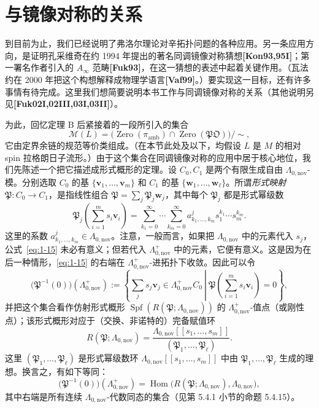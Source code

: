 
\section{与镜像对称的关系}
\label{sec:1-4}

到目前为止，我们已经说明了弗洛尔理论对辛拓扑问题的各种应用。另一条应用方向，是证明孔采维奇在约 1994 年提出的著名同调镜像对称猜想\textbf{[Kon93,95I]}；第一署名作者引入的 $A_\infty$ 范畴\textbf{[Fuk93]}，在这一猜想的表述中起着关键作用。（瓦法约在 2000 年把这个构想解释成物理学语言\textbf{[Vaf99]}。）要实现这一目标，还有许多事情有待完成。这里我们想简要说明本书工作与同调镜像对称的关系（其他说明另见\textbf{[Fuk02I,02III,03I,03II]}）。

为此，回忆定理 B 后紧接着的一段所引入的集合
\[
  \mathcal M(L)
  =\bigl(\operatorname{Zero}(\pi_{\mathrm{amb}})
    \cap\operatorname{Zero}(\mathfrak{PO})\bigr)/{\sim},
\]
它由定界余链的规范等价类组成。（在本节此处及以下，均假设 $L$ 是 $M$ 的相对 spin 拉格朗日子流形。）由于这个集合在同调镜像对称的应用中居于核心地位，我们先陈述一个把它描述成形式概形的定理。设 $C_0,C_1$ 是两个有限生成自由 $\Lambda_{0,\mathrm{nov}}$-模。分别选取 $C_0$ 的基 $\{\mathbf v_1,\ldots,\mathbf v_m\}$ 和 $C_1$ 的基 $\{\mathbf w_1,\ldots,\mathbf w_\ell\}$。所谓\emph{形式映射} $\mathfrak P:C_0\to C_1$，是指线性组合 $\mathfrak P=\sum_j\mathfrak P_j\mathbf w_j$，其中每个 $\mathfrak P_j$ 都是形式幂级数
\begin{equation}
  \mathfrak P_j\!\left(\sum_{i=1}^{m}s_i\mathbf v_i\right)
  =\sum_{k_1=0}^{\infty}\cdots\sum_{k_m=0}^{\infty}
    a^j_{k_1,\ldots,k_m}s_1^{k_1}\cdots s_m^{k_m}.
  \tag{1.15}\label{eq:1-15}
\end{equation}
这里的系数 $a^j_{k_1,\ldots,k_m}\in\Lambda_{0,\mathrm{nov}}$。注意，一般而言，如果把 $\Lambda_{0,\mathrm{nov}}$ 中的元素代入 $s_j$，公式~\eqref{eq:1-15} 未必有意义；但若代入 $\Lambda^+_{0,\mathrm{nov}}$ 中的元素，它便有意义。这是因为在后一种情形，\eqref{eq:1-15} 的右端在 $\Lambda^+_{0,\mathrm{nov}}$-进拓扑下收敛。因此可以令
\[
  \bigl(\mathfrak P^{-1}(0)\bigr)(\Lambda^+_{0,\mathrm{nov}})
  :=\left\{
    \left.\sum_j s_j\mathbf v_j\in\Lambda^+_{0,\mathrm{nov}}C_0
    \ \right|\
    \mathfrak P\!\left(\sum_{i=1}^{m}s_i\mathbf v_i\right)=0
  \right\},
\]
并把这个集合看作仿射形式概形
$\operatorname{Spf}(R(\mathfrak P;\Lambda_{0,\mathrm{nov}}))$
的 $\Lambda^+_{0,\mathrm{nov}}$-值点（或刚性点）；该形式概形对应于（交换、非诺特的）完备赋值环
\[
  R(\mathfrak P;\Lambda_{0,\mathrm{nov}})
  =\frac{\Lambda_{0,\mathrm{nov}}[[s_1,\ldots,s_m]]}
  {(\mathfrak P_1,\ldots,\mathfrak P_\ell)}.
\]
这里 $(\mathfrak P_1,\ldots,\mathfrak P_\ell)$ 是形式幂级数环
$\Lambda_{0,\mathrm{nov}}[[s_1,\ldots,s_m]]$
中由 $\mathfrak P_1,\ldots,\mathfrak P_\ell$ 生成的理想。换言之，有如下等同：
\[
  \bigl(\mathfrak P^{-1}(0)\bigr)(\Lambda^+_{0,\mathrm{nov}})
  =\operatorname{Hom}\bigl(R(\mathfrak P;\Lambda_{0,\mathrm{nov}}),
    \Lambda_{0,\mathrm{nov}}\bigr),
\]
其中右端是所有连续 $\Lambda_{0,\mathrm{nov}}$-代数同态的集合（见第 5.4.1 小节的命题 5.4.15）。


